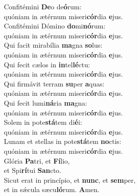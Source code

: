 \evenverse Confitémini \textbf{De}o de\textbf{ó}rum:~\*\\
\evenverse quóniam in ætérnum miseri\textbf{cór}dia \textbf{e}jus.\\
\oddverse Confitémini Dómino \textbf{do}mi\textbf{nó}rum:~\*\\
\oddverse quóniam in ætérnum miseri\textbf{cór}dia \textbf{e}jus.\\
\evenverse Qui facit mirabília \textbf{ma}gna \textbf{so}lus:~\*\\
\evenverse quóniam in ætérnum miseri\textbf{cór}dia \textbf{e}jus.\\
\oddverse Qui fecit cælos in \textbf{in}tel\textbf{lé}ctu:~\*\\
\oddverse quóniam in ætérnum miseri\textbf{cór}dia \textbf{e}jus.\\
\evenverse Qui firmávit terram \textbf{su}per \textbf{a}quas:~\*\\
\evenverse quóniam in ætérnum miseri\textbf{cór}dia \textbf{e}jus.\\
\oddverse Qui fecit lumi\textbf{ná}ria \textbf{ma}gna:~\*\\
\oddverse quóniam in ætérnum miseri\textbf{cór}dia \textbf{e}jus.\\
\evenverse Solem in pote\textbf{stá}tem di\textbf{é}i:~\*\\
\evenverse quóniam in ætérnum miseri\textbf{cór}dia \textbf{e}jus.\\
\oddverse Lunam et stellas in pote\textbf{stá}tem \textbf{no}ctis:~\*\\
\oddverse quóniam in ætérnum miseri\textbf{cór}dia \textbf{e}jus.\\
\evenverse Glória \textbf{Pa}tri, et \textbf{Fí}lio,~\*\\
\evenverse et Spi\textbf{rí}tui \textbf{San}cto.\\
\oddverse Sicut erat in princípio, et \textbf{nunc}, et \textbf{sem}per,~\*\\
\oddverse et in sǽcula sæcu\textbf{ló}rum. \textbf{A}men.\\
